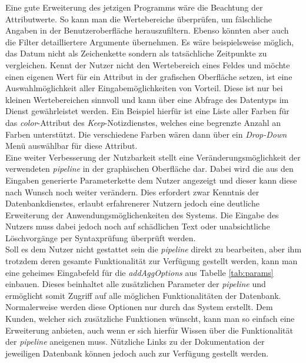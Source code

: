 Eine gute Erweiterung des jetzigen Programms wäre die Beachtung der Attributwerte. So kann man die Wertebereiche überprüfen, um fälschliche Angaben in der Benutzeroberfläche herauszufiltern. Ebenso könnten aber auch die Filter detailliertere Argumente übernehmen. Es wäre beispielsweise möglich, das Datum nicht als Zeichenkette sondern als tatsächliche Zeitpunkte zu vergleichen. Kennt der Nutzer nicht den Wertebereich eines Feldes und möchte einen eigenen Wert für ein Attribut in der grafischen Oberfläche setzen, ist eine Auswahlmöglichkeit aller Eingabemöglichkeiten von Vorteil. Diese ist nur bei kleinen Wertebereichen sinnvoll und kann über eine Abfrage des Datentyps im Dienst gewährleistet werden. Ein Beispiel hierfür ist eine Liste aller Farben für das \textit{color}-Attribut des \textit{Keep}-Notizdienstes, welches eine begrenzte Anzahl an Farben unterstützt. Die verschiedene Farben wären dann über ein \textit{Drop-Down} Menü auswählbar für diese Attribut.\\
Eine weiter Verbesserung der Nutzbarkeit stellt eine Veränderungsmöglichkeit der verwendeten \textit{pipeline} in der graphischen Oberfläche dar. Dabei wird die aus den Eingaben generierte Parameterkette dem Nutzer angezeigt und dieser kann diese nach Wunsch noch weiter verändern. Dies erfordert zwar Kenntnis der Datenbankdienstes, erlaubt erfahrenerer Nutzern jedoch eine deutliche Erweiterung der Anwendungsmöglichenkeiten des Systems. Die Eingabe des Nutzers muss dabei jedoch noch auf schädlichen Text oder unabsichtliche Löschvorgänge per Syntaxprüfung überprüft werden.\\
Soll es dem Nutzer nicht gestattet sein die \textit{pipeline} direkt zu bearbeiten, aber ihm trotzdem deren gesamte Funktionalität zur Verfügung gestellt werden, kann man eine geheimes Eingabefeld für die \textit{addAggOptions} aus Tabelle \ref{tab:params} einbauen. Dieses beinhaltet alle zusätzlichen Parameter der \textit{pipeline} und ermöglicht somit Zugriff auf alle möglichen Funktionalitäten der Datenbank. Normalerweise werden diese Optionen nur durch das System erstellt. Dem Kunden, welcher sich zusätzliche Funktionen wünscht, kann man so einfach eine Erweiterung anbieten, auch wenn er sich hierfür Wissen über die Funktionalität der \textit{pipeline} aneigenen muss. Nützliche Links zu der Dokumentation der jeweiligen Datenbank können jedoch auch zur Verfügung gestellt werden. 

